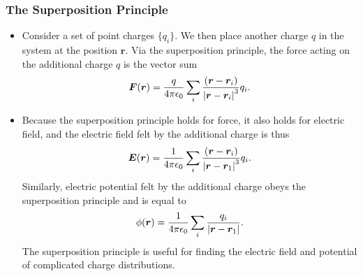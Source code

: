 \documentclass[11pt, a4paper]{article}
\renewcommand{\vec}[1]{\bm{#1}} %
\renewcommand{\r}{\vec{r}}
\newcommand{\ee}{\epsilon_{0}}  %
\begin{document}
\subsubsection{The Superposition Principle}
\begin{itemize}
	\item Consider a set of point charges $ \{q_{i}\} $. We then place another charge $ q $ in the system at the position $ \r $. Via the superposition principle, the force acting on the additional charge $ q $ is the vector sum
	\begin{equation*}
		\vec{F}(\r) = \frac{q}{4\pi \ee} \sum_{i}\frac{(\r - \r_{i})}{\abs{\r - \r_{i}}^{3}}q_{i}.
	\end{equation*}
	
	\item Because the superposition principle holds for force, it also holds for electric field, and the electric field felt by the additional charge is thus
	\begin{equation*}
		\vec{E}(\r) = \frac{1}{4\pi \ee} \sum_{i}\frac{(\r - \r_{i})}{\abs{\r - \r_{1}}^{3}}q_{i}.
	\end{equation*}
	Similarly, electric potential felt by the additional charge obeys the superposition principle and is equal to
	\begin{equation*}
		\phi(\r) = \frac{1}{4\pi \ee} \sum_{i}\frac{q_{i}}{\abs{\r - \r_{1}}}.
	\end{equation*}
	The superposition principle is useful for finding the electric field and potential of complicated charge distributions.
\end{itemize}
\end{document}
